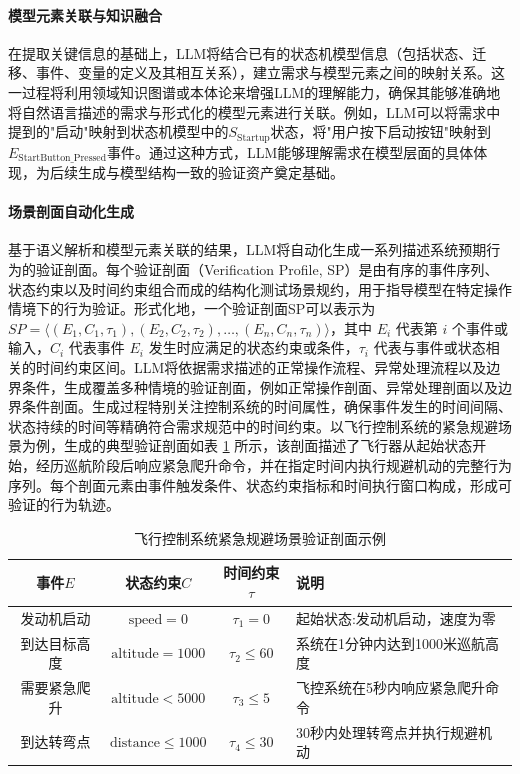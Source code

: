 \paragraph{模型元素关联与知识融合}
在提取关键信息的基础上，LLM将结合已有的状态机模型信息（包括状态、迁移、事件、变量的定义及其相互关系），建立需求与模型元素之间的映射关系。这一过程将利用领域知识图谱或本体论来增强LLM的理解能力，确保其能够准确地将自然语言描述的需求与形式化的模型元素进行关联。例如，LLM可以将需求中提到的"启动"映射到状态机模型中的$S_{\text{Startup}}$状态，将"用户按下启动按钮"映射到$E_{\text{StartButton\_Pressed}}$事件。通过这种方式，LLM能够理解需求在模型层面的具体体现，为后续生成与模型结构一致的验证资产奠定基础。

\paragraph{场景剖面自动化生成}
基于语义解析和模型元素关联的结果，LLM将自动化生成一系列描述系统预期行为的验证剖面。每个验证剖面（Verification Profile, SP）是由有序的事件序列、状态约束以及时间约束组合而成的结构化测试场景规约，用于指导模型在特定操作情境下的行为验证。形式化地，一个验证剖面SP可以表示为 \( SP = \langle (E_1, C_1, \tau_1), (E_2, C_2, \tau_2), \dots, (E_n, C_n, \tau_n) \rangle \)，其中 \( E_i \) 代表第 \( i \) 个事件或输入，\( C_i \) 代表事件 \( E_i \) 发生时应满足的状态约束或条件，\( \tau_i \) 代表与事件或状态相关的时间约束区间。LLM将依据需求描述的正常操作流程、异常处理流程以及边界条件，生成覆盖多种情境的验证剖面，例如正常操作剖面、异常处理剖面以及边界条件剖面。生成过程特别关注控制系统的时间属性，确保事件发生的时间间隔、状态持续的时间等精确符合需求规范中的时间约束。以飞行控制系统的紧急规避场景为例，生成的典型验证剖面如表 \ref{table:example_profile} 所示，该剖面描述了飞行器从起始状态开始，经历巡航阶段后响应紧急爬升命令，并在指定时间内执行规避机动的完整行为序列。每个剖面元素由事件触发条件、状态约束指标和时间执行窗口构成，形成可验证的行为轨迹。

\begin{table}[htbp]
    \centering
    \caption{飞行控制系统紧急规避场景验证剖面示例}
    \label{table:example_profile}
    \begin{tabular}{|c|c|c|l|}
        \hline
        事件$E$ & 状态约束$C$ & 时间约束$\tau$ & 说明 \\
        \hline
        发动机启动 & $\text{speed}=0$ & $\tau_1=0$ & 起始状态:发动机启动，速度为零 \\
        \hline
        到达目标高度 & $\text{altitude}=1000$ & $\tau_2 \leq 60$ & 系统在1分钟内达到1000米巡航高度 \\
        \hline
        需要紧急爬升 & $\text{altitude}<5000$ & $\tau_3 \leq 5$ & 飞控系统在5秒内响应紧急爬升命令 \\
        \hline
        到达转弯点 & $\text{distance}\leq 1000$ & $\tau_4 \leq 30$ & 30秒内处理转弯点并执行规避机动 \\
        \hline
    \end{tabular}
\end{table}

